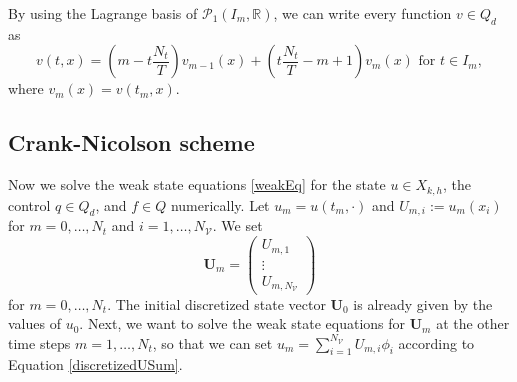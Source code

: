 By using the Lagrange basis of $\mathcal{P}_1(I_m,\mathbb{R})$, we can write every function $v \in Q_d$ as
\begin{equation}
\label{discretizeVariableInTime}
v(t,x)=\left(m-t\frac{N_t}{T}\right) v_{m-1}(x)+\left(t\frac{N_t}{T}-m+1\right) v_m(x)\text{ for }t\in I_m,
\end{equation}
where $v_m(x)=v(t_m,x)$.


\subsection{Crank-Nicolson scheme}
Now we solve the weak state equations \eqref{weakEq} for the state $u\in X_{k,h}$, the control $q\in Q_d$, and $f\in Q$ numerically. Let $u_m=u(t_m, \cdot)$ and $U_{m,i}:=u_m(x_i)$ for $m=0,\dotsc,N_t$ and $i=1,\dotsc,N_\mathcal{V}$. We set
\begin{displaymath}
\mathbf{U}_m=\begin{pmatrix} U_{m,1} \\ \vdots \\ U_{m,N_\mathcal{V}} \end{pmatrix}
\end{displaymath}
for $m=0,\dotsc,N_t$. The initial discretized state vector $\mathbf{U}_0$ is already given by the values of $u_0$. Next, we want to solve the weak state equations for $\mathbf{U}_m$ at the other time steps $m=1,\dotsc,N_t$, so that we can set $u_m=\sum_{i=1}^{N_\mathcal{V}}U_{m,i}\phi_i$ according to Equation \eqref{discretizedUSum}.

